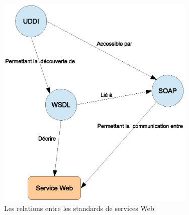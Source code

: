 \begin{figure}[h]
    \centering
    \includegraphics[width=0.85\textwidth]{figs/ws-standards-relationships.eps}
    \caption{Les relations entre les standards de services Web
      \cite{erl2004service}}
    \label{fig:ws-standards-relationships}
\end{figure}

